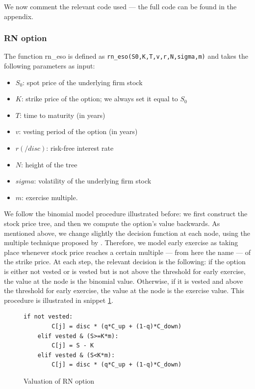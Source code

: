 We now comment the relevant code used --- the full code can be found in the appendix.

\subsubsection{RN option}
The function rn\_eso is defined as \verb|rn_eso(S0,K,T,v,r,N,sigma,m)| and takes the following parameters as input:
\begin{itemize}
    \item $S_0$: spot price of the underlying firm stock
    \item $K$: strike price of the option; we always set it equal to $S_0$ %
    \item $T$: time to maturity (in years)
    \item $v$: vesting period of the option (in years)
    \item $r (/disc)$: risk-free interest rate
    \item $N$: height of the tree
    \item $sigma$: volatility of the underlying firm stock
    \item $m$: exercise multiple.
\end{itemize}

    
We follow the binomial model procedure illustrated before: we first construct the stock price tree, and then we compute the option's value backwards. As mentioned above, we change slightly the decision function at each node, using the multiple technique proposed by \cite{hull2004value}. Therefore, we model early exercise as taking place whenever stock price reaches a certain multiple --- from here the name --- of the strike price.
At each step, the relevant decision is the following: if the option is either not vested or is vested but is not above the threshold for early exercise, the value at the node is the binomial value. Otherwise, if it is vested and above the threshold for early exercise, the value at the node is the exercise value. This procedure is illustrated in snippet \ref*{fig:val_rn}.

\begin{figure}[H]
    \begin{lstlisting}[breaklines, basicstyle=\ttfamily\small]
    if not vested: 
        C[j] = disc * (q*C_up + (1-q)*C_down)
    elif vested & (S>=K*m):            
        C[j] = S - K
    elif vested & (S<K*m):
        C[j] = disc * (q*C_up + (1-q)*C_down)
    \end{lstlisting}
    \caption{Valuation of RN option}
 \label{fig:val_rn}
\end{figure}


